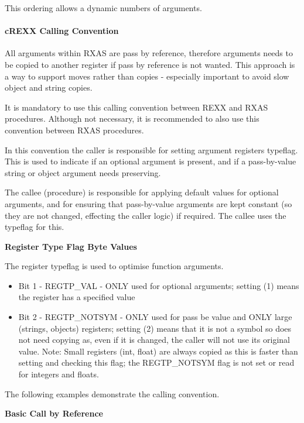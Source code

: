 This ordering allows a dynamic numbers of arguments.

\paragraph{cREXX Calling Convention}

All arguments within RXAS are pass by reference, therefore arguments needs to be copied to another register if pass by reference is not wanted.
This approach is a way to support moves rather than copies - especially important to avoid slow object and string copies.

It is mandatory to use this calling convention between REXX and RXAS procedures. Although not necessary, it is recommended to also use this convention between RXAS procedures.

In this convention the caller is responsible for setting argument registers\textquotesingle{} typeflag. This is used to indicate if an optional argument is present, and if a pass-by-value string or object argument needs preserving.

The callee (procedure) is responsible for applying default values for optional arguments, and for ensuring that pass-by-value arguments are kept constant (so they are not changed, effecting the caller logic) if required. The callee uses the typeflag for this.

\textbf{Register Type Flag Byte Values}

The register typeflag is used to optimise function arguments.

\begin{itemize}
\item Bit 1 - REGTP\_VAL - ONLY used for optional arguments; setting (1) means the register has a specified value

\item Bit 2 - REGTP\_NOTSYM - ONLY used for \textquotedbl{}pass be value\textquotedbl{} and ONLY large (strings, objects) registers; setting (2) means that
it is not a symbol so does not need copying as, even if it is changed, the caller will not use its original value.
Note: Small registers (int, float) are always copied as this is faster than setting and checking this flag; the REGTP\_NOTSYM flag is not set or read for integers and floats.

\end{itemize}

The following examples demonstrate the calling convention.

\textbf{Basic Call by Reference}

